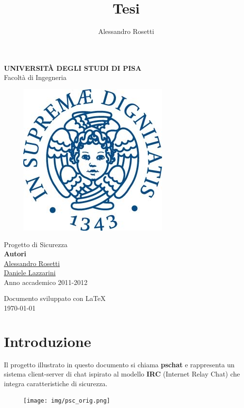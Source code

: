 \documentclass[a4paper,titlepage]{article}
\author{Alessandro Rosetti}
\title{Tesi}
\begin{document}
\begin{titlepage}
\begin{center}
\huge{\textbf{UNIVERSIT\`A DEGLI STUDI DI PISA}}\\
\LARGE{Facoltà di Ingegneria}
\begin{figure}[H]
  \centering \includegraphics[scale=0.35]{img/unipi.jpg}
\end{figure}
\vspace{2.5cm}
\Huge{Progetto di Sicurezza}\\[2.5cm]

\large{\textbf{Autori}}\\
\underline{\Large{Alessandro Rosetti}}\\
\underline{\Large{Daniele Lazzarini}}\\

\vfill
\large{Anno accademico 2011-2012}\\[2.0cm]
\end{center}
\end{titlepage}

\begin{center}
\thispagestyle{empty}
\newpage
\vfill
Documento sviluppato con \LaTeX\\
\today
\end{center}

\newpage

\tableofcontents \thispagestyle{fancy}
\newpage

\section{Introduzione}  \thispagestyle{plain}
Il progetto illustrato in questo documento si chiama \textbf{pschat} e rappresenta un sistema client-server di chat ispirato al modello \textbf{IRC} (Internet Relay Chat) che integra caratteristiche di sicurezza.\\
\begin{figure}[H]
  \centering \texttt{[image: img/psc\_orig.png]}
\end{figure}
\end{document}
